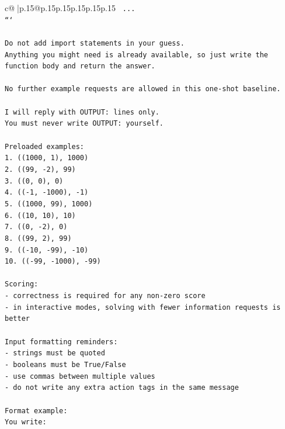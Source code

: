 \documentclass{article}
\begin{document}
{\begin{supertabular}{c@{$\;$}|p{.15\linewidth}@{}p{.15\linewidth}p{.15\linewidth}p{.15\linewidth}p{.15\linewidth}p{.15\linewidth}}
{{{\texttt{    ...} \\
\texttt{```} \\
\\ 
\texttt{Do not add import statements in your guess.} \\
\texttt{Anything you might need is already available, so just write the function body and return the answer.} \\
\\ 
\texttt{No further example requests are allowed in this one{-}shot baseline.} \\
\\ 
\texttt{I will reply with OUTPUT: lines only.} \\
\texttt{You must never write OUTPUT: yourself.} \\
\\ 
\texttt{Preloaded examples:} \\
\texttt{1. ((1000, 1), 1000)} \\
\texttt{2. ((99, {-}2), 99)} \\
\texttt{3. ((0, 0), 0)} \\
\texttt{4. (({-}1, {-}1000), {-}1)} \\
\texttt{5. ((1000, 99), 1000)} \\
\texttt{6. ((10, 10), 10)} \\
\texttt{7. ((0, {-}2), 0)} \\
\texttt{8. ((99, 2), 99)} \\
\texttt{9. (({-}10, {-}99), {-}10)} \\
\texttt{10. (({-}99, {-}1000), {-}99)} \\
\\ 
\texttt{Scoring:} \\
\texttt{{-} correctness is required for any non{-}zero score} \\
\texttt{{-} in interactive modes, solving with fewer information requests is better} \\
\\ 
\texttt{Input formatting reminders:} \\
\texttt{{-} strings must be quoted} \\
\texttt{{-} booleans must be True/False} \\
\texttt{{-} use commas between multiple values} \\
\texttt{{-} do not write any extra action tags in the same message} \\
\\ 
\texttt{Format example:} \\
\texttt{You write:} \\
}}}
\end{supertabular}}
\end{document}
